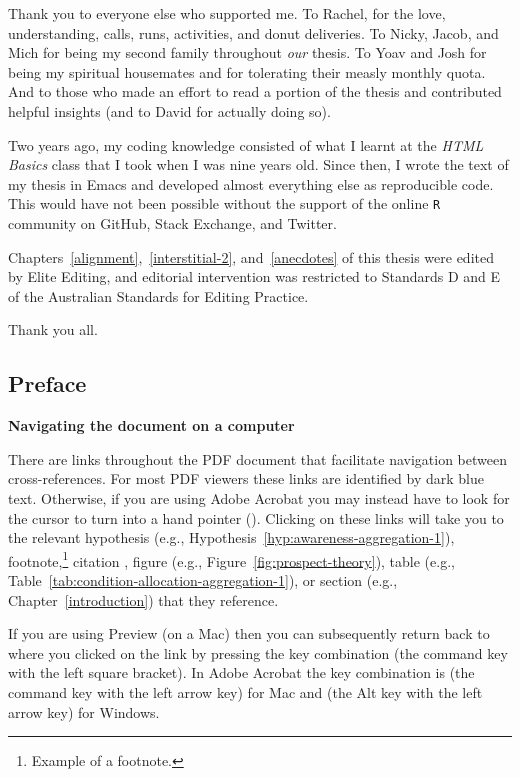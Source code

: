 \documentclass[a4paper, nobind]{templates/ociamthesis}
\newenvironment{preface}%
{   \begin{alwayssingle}\chapter*{Preface}
    \thispagestyle{empty}
    \pagestyle{empty}
    \setlength{\baselineskip}{\frontmatterbaselineskip}
  }
  {\end{alwayssingle}}
\theoremstyle{definition}
\theoremstyle{definition}
\theoremstyle{definition}
\theoremstyle{definition}
\theoremstyle{remark}
\begin{document}
\begin{romanpages}
\begin{acknowledgements}
  Thank you to everyone else who supported me. To Rachel, for the love,
  understanding, calls, runs, activities, and donut deliveries. To Nicky, Jacob,
  and Mich for being my second family throughout \emph{our} thesis. To Yoav and Josh
  for being my spiritual housemates and for tolerating their measly monthly quota.
  And to those who made an effort to read a portion of the thesis and contributed
  helpful insights (and to David for actually doing so).

  Two years ago, my coding knowledge consisted of what I learnt at the \emph{HTML
  Basics} class that I took when I was nine years old. Since then, I wrote the
  text of my thesis in Emacs and developed almost everything else as reproducible
  code. This would have not been possible without the support of the online \texttt{R}
  community on GitHub, Stack Exchange, and Twitter.

  Chapters~\ref{alignment},~\ref{interstitial-2}, and~\ref{anecdotes} of this
  thesis were edited by Elite Editing, and editorial intervention was restricted
  to Standards D and E of the Australian Standards for Editing Practice.

  Thank you all.
\end{acknowledgements}

\begin{preface}
 	\noindent \textbf{Navigating the document on a computer}

  There are links throughout the PDF document that facilitate navigation between
  cross-references. For most PDF viewers these links are identified by
  \textcolor{mylinkcolor}{dark blue} text. Otherwise, if you are using Adobe
  Acrobat you may instead have to look for the cursor to turn into a hand pointer
  (\faHandPointer[regular]). Clicking on these links will take you to the relevant
  hypothesis (e.g., Hypothesis~\ref{hyp:awareness-aggregation-1}),
  footnote,\footnote{Example of a footnote.} citation \autocite[e.g.,][]{kahneman1979}, figure (e.g.,
  Figure~\ref{fig:prospect-theory}), table (e.g.,
  Table~\ref{tab:condition-allocation-aggregation-1}), or section (e.g.,
  Chapter~\ref{introduction}) that they reference.

  If you are using Preview (on a Mac) then you can subsequently return back to
  where you clicked on the link by pressing the key combination \keys{\cmd + [}
  (the command key with the left square bracket). In Adobe Acrobat the key
  combination is \keys{\cmd + \arrowkeyleft} (the command key with the left arrow
  key) for Mac and \keys{\Altwin + \arrowkeyleft} (the Alt key with the left arrow
  key) for Windows.


\end{preface}
\end{romanpages}
\end{document}
